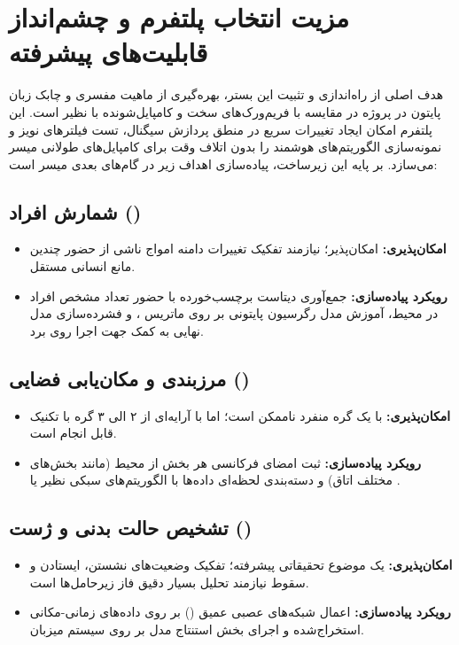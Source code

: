 \documentclass[12pt,a4paper]{article}
\begin{document}
\section{مزیت انتخاب پلتفرم  و چشم‌انداز قابلیت‌های پیشرفته}
هدف اصلی از راه‌اندازی و تثبیت این بستر، بهره‌گیری از ماهیت مفسری و چابک زبان پایتون در پروژه  در مقایسه با فریم‌ورک‌های سخت و کامپایل‌شونده با  نظیر  است. این پلتفرم امکان ایجاد تغییرات سریع در منطق پردازش سیگنال، تست فیلترهای نویز و نمونه‌سازی الگوریتم‌های هوشمند را بدون اتلاف وقت برای کامپایل‌های طولانی میسر می‌سازد. بر پایه این زیرساخت، پیاده‌سازی اهداف زیر در گام‌های بعدی میسر است:

\subsection{شمارش افراد ()}
\begin{itemize}
\item \textbf{امکان‌پذیری:} امکان‌پذیر؛ نیازمند تفکیک تغییرات دامنه امواج ناشی از حضور چندین مانع انسانی مستقل.
\item \textbf{رویکرد پیاده‌سازی:} جمع‌آوری دیتاست برچسب‌خورده با حضور تعداد مشخص افراد در محیط، آموزش مدل رگرسیون پایتونی بر روی ماتریس ، و فشرده‌سازی مدل نهایی به کمک  جهت اجرا روی برد.
\end{itemize}

\subsection{مرزبندی و مکان‌یابی فضایی ()}
\begin{itemize}
\item \textbf{امکان‌پذیری:} با یک گره منفرد ناممکن است؛ اما با آرایه‌ای از ۲ الی ۳ گره با تکنیک  قابل انجام است.
\item \textbf{رویکرد پیاده‌سازی:} ثبت امضای فرکانسی هر بخش از محیط (مانند بخش‌های مختلف اتاق) و دسته‌بندی لحظه‌ای داده‌ها با الگوریتم‌های سبکی نظیر  یا .
\end{itemize}

\subsection{تشخیص حالت بدنی و ژست ()}
\begin{itemize}
\item \textbf{امکان‌پذیری:} یک موضوع تحقیقاتی پیشرفته؛ تفکیک وضعیت‌های نشستن، ایستادن و سقوط نیازمند تحلیل بسیار دقیق فاز زیرحامل‌ها است.
\item \textbf{رویکرد پیاده‌سازی:} اعمال شبکه‌های عصبی عمیق () بر روی داده‌های زمانی-مکانی استخراج‌شده و اجرای بخش استنتاج مدل بر روی سیستم میزبان.
\end{itemize}
\end{document}
